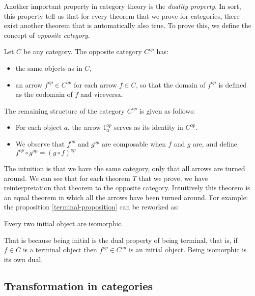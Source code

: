 Another important property in category theory is the \emph{duality property}. In sort, this property tell us that for every theorem that we prove for categories, there exist another theorem that is automatically also true. To prove this, we define the concept of \emph{opposite category}.


\begin{definition}\cite[Definition 1.2.1]{riehl2017category}
  Let $C$ be any category. The opposite category $C^{op}$ has:
  \begin{itemize}
  \item the same objects as in $C$,
  \item an arrow $f^{op}\in C^{op}$ for each arrow $f \in C$, so that the domain of $f^{op}$ is defined as the codomain of $f$ and viceversa.
  \end{itemize}
  The remaining structure of the category $C^{op}$ is given as follows:
  \begin{itemize}
  \item For each object $a$, the arrow $1_a^{op}$ serves as its identity in $C^{op}$.
  \item We observe that $f^{op}$ and $g^{op}$ are composable when $f$ and $g$ are, and define $f^{op} \circ g^{op} = (g \circ f)^{op}$
  \end{itemize}
\end{definition}


The intuition is that we have the same category, only that all arrows are turned around. We can see that  for each theorem $T$ that we prove, we have reinterpretation that theorem to the opposite category. Intuitively this theorem is an equal theorem in which all the arrows have been turned around. For example: the proposition
\ref{terminal-proposition} can be reworked as:

\begin{proposition}
  Every two initial object are isomorphic.
\end{proposition}


That is because being initial is the dual property of being terminal, that is, if $f\in C$ is a terminal object then $f^{op}\in C^{op}$ is an initial object. Being isomorphic is its own dual.

\subsection{Transformation in categories}




